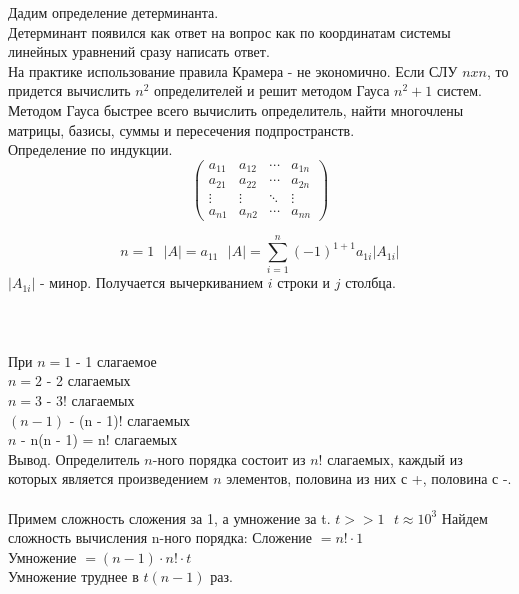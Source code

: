 Дадим определение детерминанта.\\
Детерминант появился как ответ на вопрос как по координатам системы линейных
уравнений сразу написать ответ.\\
На практике использование правила Крамера - не экономично. Если СЛУ $nxn$, то
придется вычислить $n^2$ определителей и решит методом Гауса $n^2 + 1$ систем.\\
Методом Гауса быстрее всего вычислить определитель, найти многочлены матрицы,
базисы, суммы и пересечения подпространств.\\

Определение по индукции.\\

\begin{displaymath}
\left(\begin{array}{lccr}
a_{11} & a_{12} & \cdots & a_{1n}\\
a_{21} & a_{22} & \cdots & a_{2n}\\
\vdots & \vdots & \ddots & \vdots\\
a_{n1} & a_{n2} & \cdots & a_{nn}
\end{array}\right)
\end{displaymath}

\[n = 1 ~~~ |A| = a_{11} ~~~ |A| = \sum^n_{i = 1} (-1)^{1 + 1} a_{1i} |A_{1i}|\]
$|A_{1i}|$ - минор. Получается вычеркиванием $i$ строки и $j$ столбца.\\
\\
\\
\\

При
$n = 1$ - 1 слагаемое\\
$n = 2$ - 2 слагаемых\\
$n = 3$ - 3! слагаемых\\
$(n - 1)$ - (n - 1)! слагаемых\\
$n$ - n(n - 1) = n! слагаемых\\
Вывод. Определитель $n$-ного порядка состоит из $n!$ слагаемых, каждый из которых
является произведением $n$ элементов, половина из них с +, половина с -.\\

\\
Примем сложность сложения за 1, а умножение за t. $t >> 1 ~~~ t \approx 10^3$
Найдем сложность вычисления n-ного порядка:
Сложение $= n! \cdot 1$\\
Умножение $= (n - 1) \cdot n! \cdot t$\\
Умножение труднее в $t(n - 1)$ раз.\\

